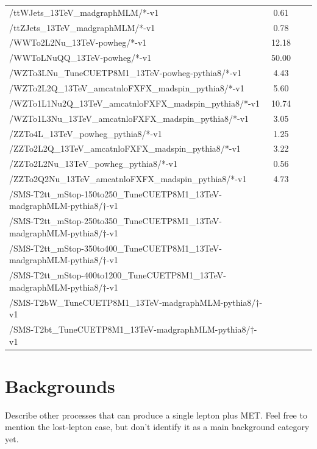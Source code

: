 \begin{table}[htp]
{\begin{tabular}{|l|c|c|c|}
/ttWJets\_13TeV\_madgraphMLM/*-v1 & 0.61 \\
/ttZJets\_13TeV\_madgraphMLM/*-v1 & 0.78 \\
/WWTo2L2Nu\_13TeV-powheg/*-v1 & 12.18 \\
/WWToLNuQQ\_13TeV-powheg/*-v1 & 50.00  \\
/WZTo3LNu\_TuneCUETP8M1\_13TeV-powheg-pythia8/*-v1 & 4.43 \\
/WZTo2L2Q\_13TeV\_amcatnloFXFX\_madspin\_pythia8/*-v1 & 5.60 \\
/WZTo1L1Nu2Q\_13TeV\_amcatnloFXFX\_madspin\_pythia8/*-v1 & 10.74 \\
/WZTo1L3Nu\_13TeV\_amcatnloFXFX\_madspin\_pythia8/*-v1 & 3.05 \\
/ZZTo4L\_13TeV\_powheg\_pythia8/*-v1 & 1.25 \\
/ZZTo2L2Q\_13TeV\_amcatnloFXFX\_madspin\_pythia8/*-v1 & 3.22 \\
/ZZTo2L2Nu\_13TeV\_powheg\_pythia8/*-v1 & 0.56 \\
/ZZTo2Q2Nu\_13TeV\_amcatnloFXFX\_madspin\_pythia8/*-v1 & 4.73 \\
/SMS-T2tt\_mStop-150to250\_TuneCUETP8M1\_13TeV-madgraphMLM-pythia8/$\dagger$-v1 & \\
/SMS-T2tt\_mStop-250to350\_TuneCUETP8M1\_13TeV-madgraphMLM-pythia8/$\dagger$-v1 & \\
/SMS-T2tt\_mStop-350to400\_TuneCUETP8M1\_13TeV-madgraphMLM-pythia8/$\dagger$-v1 & \\
/SMS-T2tt\_mStop-400to1200\_TuneCUETP8M1\_13TeV-madgraphMLM-pythia8/$\dagger$-v1 & \\
/SMS-T2bW\_TuneCUETP8M1\_13TeV-madgraphMLM-pythia8/$\dagger$-v1 & \\
/SMS-T2bt\_TuneCUETP8M1\_13TeV-madgraphMLM-pythia8/$\dagger$-v1 & \\
\hline
\end{tabular}
}
\end{table}

\section{Backgrounds}
\label{sec:stop:bkgs}

Describe other processes that can produce a single lepton plus
MET. Feel free to mention the lost-lepton case, but don't identify it
as a main background category yet.


